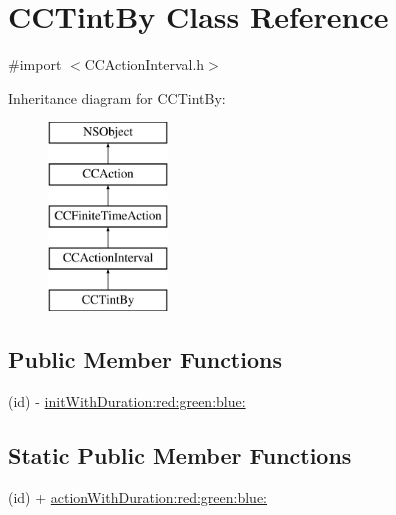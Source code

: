 \hypertarget{interface_c_c_tint_by}{\section{C\-C\-Tint\-By Class Reference}
\label{interface_c_c_tint_by}
}


{\ttfamily \#import $<$C\-C\-Action\-Interval.\-h$>$}

Inheritance diagram for C\-C\-Tint\-By\-:\begin{figure}[H]
\begin{center}
\leavevmode
\includegraphics[height=5.000000cm]{interface_c_c_tint_by}
\end{center}
\end{figure}
\subsection*{Public Member Functions}
\begin{DoxyCompactItemize}
\item 
(id) -\/ \hyperlink{interface_c_c_tint_by_a9da5bbea40f014952c67e0bbcb13d588}{init\-With\-Duration\-:red\-:green\-:blue\-:}
\end{DoxyCompactItemize}
\subsection*{Static Public Member Functions}
\begin{DoxyCompactItemize}
\item 
(id) + \hyperlink{interface_c_c_tint_by_a36d6121c5be85c147b4e3dea5401dfc0}{action\-With\-Duration\-:red\-:green\-:blue\-:}
\end{DoxyCompactItemize}
